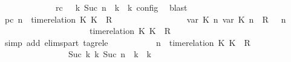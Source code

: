 \begin{isabellebody}
\ \ \ \ \ \ \ \ \ \ \ \ \ rc{\isacharcolon}{\isacartoucheopen}{\isasymrho}\ {\isasymin}\ {\isasymlbrakk}\ {\isasymGamma}\isactrlsub k{\isacharcomma}\ Suc\ n\ {\isasymturnstile}\ {\isasymPsi}\isactrlsub k\ {\isasymtriangleright}\ {\isasymPhi}\isactrlsub k\ {\isasymrbrakk}\isactrlsub c\isactrlsub o\isactrlsub n\isactrlsub f\isactrlsub i\isactrlsub g{\isacartoucheclose}\ \isamarkupfalse%
\ blast\isanewline
\ \ \ \ \ \ \ \ \isamarkupfalse%
\ pc{\isacharcolon}{\isacartoucheopen}{\isacharparenleft}{\isasymGamma}{\isacharcomma}\ n\ {\isasymturnstile}\ {\isacharparenleft}{\isacharparenleft}time{\isacharminus}relation\ {\isasymlfloor}K\ K\ {\isasymin}\ R{\isacharparenright}\ {\isacharhash}\ {\isasymPsi}{\isacharparenright}\ {\isasymtriangleright}\ {\isasymPhi}{\isacharparenright}\isanewline
\ \ \ \ \ \ \ \ \ \ \ \ {\isasymhookrightarrow}\ {\isacharparenleft}{\isacharparenleft}{\isacharparenleft}{\isasymlfloor}{\isasymtau}\isactrlsub v\isactrlsub a\isactrlsub r\ {\isacharparenleft}K\ n{\isacharparenright}{\isacharcomma}\ {\isasymtau}\isactrlsub v\isactrlsub a\isactrlsub r\ {\isacharparenleft}K\ n{\isacharparenright}{\isasymrfloor}\ {\isasymin}\ R{\isacharparenright}\ {\isacharhash}\ {\isasymGamma}{\isacharparenright}{\isacharcomma}\ n\isanewline
\ \ \ \ \ \ \ \ \ \ \ \ \ \ \ \ \ \ {\isasymturnstile}\ {\isasymPsi}\ {\isasymtriangleright}\ {\isacharparenleft}{\isacharparenleft}time{\isacharminus}relation\ {\isasymlfloor}K\ K\ {\isasymin}\ R{\isacharparenright}\ {\isacharhash}\ {\isasymPhi}{\isacharparenright}{\isacharparenright}{\isacartoucheclose}\isanewline
\ \ \ \ \ \ \ \ \ \ \isamarkupfalse%
\ {\isacharparenleft}simp\ add{\isacharcolon}\ elims{\isacharunderscore}part\ tagrel{\isacharunderscore}e{\isacharparenright}\isanewline
\ \ \ \ \ \ \ \ \isamarkupfalse%
\ {\isacartoucheopen}{\isacharparenleft}{\isasymGamma}{\isacharcomma}\ n\ {\isasymturnstile}\ {\isacharparenleft}time{\isacharminus}relation\ {\isasymlfloor}K\ K\ {\isasymin}\ R{\isacharparenright}\ {\isacharhash}\ {\isasymPsi}\ {\isasymtriangleright}\ {\isasymPhi}{\isacharparenright}\isanewline
\ \ \ \ \ \ \ \ \ \ \ \ \ \ \ \ {\isasymhookrightarrow}\isactrlbsup Suc\ k\isactrlesup \ {\isacharparenleft}{\isasymGamma}\isactrlsub k{\isacharcomma}\ Suc\ n\ {\isasymturnstile}\ {\isasymPsi}\isactrlsub k\ {\isasymtriangleright}\ {\isasymPhi}\isactrlsub k{\isacharparenright}{\isacartoucheclose}\isanewline

\end{isabellebody}
